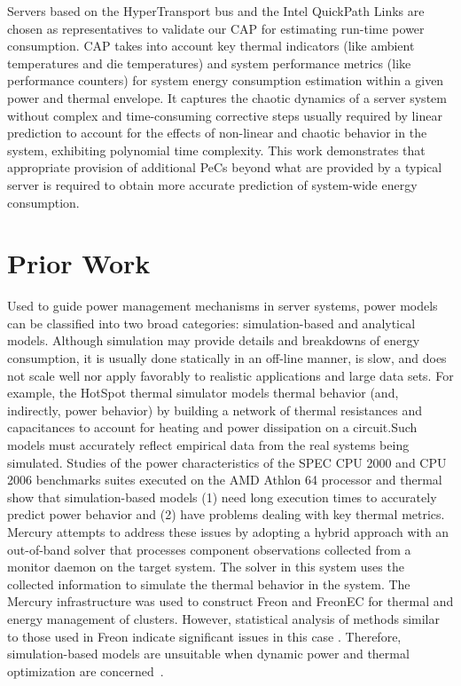 \documentclass[prodmode,acmtaco,pdftex]{acmsmall}
\begin{document}
Servers based on the HyperTransport bus \cite{HT2008} and the Intel
QuickPath Links \cite{Intel2009} are chosen as representatives to validate
our CAP for estimating run-time power consumption.  CAP takes into
account key thermal indicators (like ambient temperatures and die
temperatures) and system performance metrics (like performance counters)
for system energy consumption estimation within a given power and
thermal envelope. It captures the chaotic dynamics of a server system
without complex and time-consuming corrective steps usually required by
linear prediction to account for the effects of non-linear and chaotic
behavior in the system, exhibiting polynomial time complexity.  This
work demonstrates that appropriate provision of additional PeCs beyond
what are provided by a typical server is required to obtain more
accurate prediction of system-wide energy consumption.

\section{Prior Work}
\label{sec:priorwork}
Used to guide power management mechanisms in server systems, power
models can be classified into two broad categories: simulation-based and
analytical models. Although simulation may provide details and
breakdowns of energy consumption, it is usually done statically in an
off-line manner, is slow, and does not scale well nor apply favorably to
realistic applications and large data sets. For example, the HotSpot
thermal simulator \cite{Skadron2004} models thermal behavior (and,
indirectly, power behavior) by building a network of thermal resistances
and capacitances to account for heating and power dissipation on a
circuit.Such models must accurately reflect empirical data from the real
systems being simulated. Studies of the power characteristics of the
SPEC CPU 2000 and CPU 2006 benchmarks suites executed on the AMD Athlon
64 processor \cite{MesaMartinez2007} and thermal \cite{MesaMartinez2010}
show that simulation-based models (1) need long execution times to
accurately predict power behavior and (2) have problems dealing with key
thermal metrics.  Mercury \cite{Heath2006} attempts to address these
issues by adopting a hybrid approach with an out-of-band solver that
processes component observations collected from a monitor daemon on the
target system.  The solver in this system uses the collected information
to simulate the thermal behavior in the system.  The Mercury
infrastructure was used to construct Freon and FreonEC for thermal and
energy management of clusters. However, statistical analysis of methods
similar to those used in Freon indicate significant issues in this case
\cite{DavisRivoire2011}. Therefore, simulation-based models are
unsuitable when dynamic power and thermal optimization are
concerned~\cite{Economou2006}.
 
\end{document}

